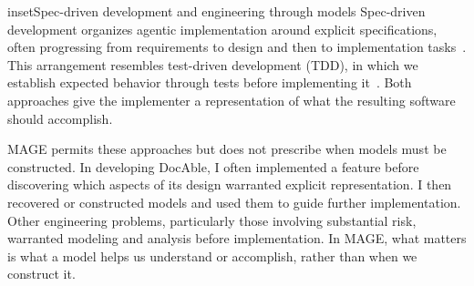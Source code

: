 \begin{bookbox}{inset}{Spec-driven development and engineering through models}
\label{inset-sdd-engineering-through-models}
Spec-driven development organizes agentic implementation around explicit specifications, often progressing from requirements to design and then to implementation tasks~\citep{agarwal2026sddpractice,githubspeckit2026sdd,openspec2026concepts,ballinger2025conductor}. This arrangement resembles test-driven development (TDD), in which we establish expected behavior through tests before implementing it~\citep{fowler2023tdd}. Both approaches give the implementer a representation of what the resulting software should accomplish.

MAGE permits these approaches but does not prescribe when models must be constructed. In developing DocAble, I often implemented a feature before discovering which aspects of its design warranted explicit representation. I then recovered or constructed models and used them to guide further implementation. Other engineering problems, particularly those involving substantial risk, warranted modeling and analysis before implementation. In MAGE, what matters is what a model helps us understand or accomplish, rather than when we construct it.
\end{bookbox}
